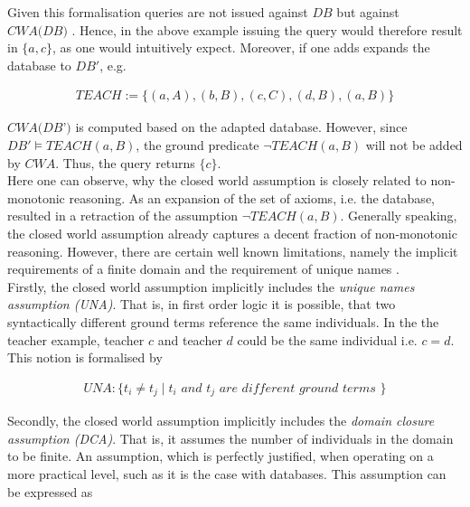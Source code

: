 \documentclass{article}
\begin{document}
Given this formalisation queries are not issued against $DB$ but against $\textit{CWA(DB)}$ \cite{BOCHMAN2007557}. Hence, in the above example issuing the query would therefore result in $\{a,c\}$, as one would intuitively expect. Moreover, if one adds expands the database to $DB'$, e.g. 

\begin{equation*}
\begin{split}
TEACH := \{(a,A), (b,B), (c,C), (d,B), (a,B)\}
\end{split}
\end{equation*}

$\textit{CWA(DB')}$ is computed based on the adapted database. However, since $DB' \models TEACH(a,B)$, the ground predicate $\neg TEACH(a,B)$ will not be added by $\textit{CWA}$. Thus, the query returns $\{c\}$. \\
Here one can observe, why the closed world assumption is closely related to non-monotonic reasoning. As an expansion of the set of axioms, i.e. the database, resulted in a retraction of the assumption $\neg TEACH(a,B)$. Generally speaking, the closed world assumption already captures a decent fraction of non-monotonic reasoning. However, there are certain well known limitations, namely the implicit requirements of a finite domain and the requirement of unique names \cite{BOCHMAN2007557, brewka1997nonmonotonic}.\\

Firstly, the closed world assumption implicitly includes the \emph{unique names assumption (UNA)}. That is, in first order logic it is possible, that two syntactically different ground terms reference the same individuals. In the the teacher example, teacher $c$ and teacher $d$ could be the same individual i.e. $c=d$. This notion is formalised by

\begin{equation*}
\begin{split}
UNA : \{t_i \neq t_j \mid t_i \textit{ and } t_j \textit{ are different ground terms } \}
\end{split}
\end{equation*}

Secondly, the closed world assumption implicitly includes the \emph{domain closure assumption (DCA)}. That is, it assumes the number of individuals in the domain to be finite. An assumption, which is perfectly justified, when operating on a more practical level, such as it is the case with databases. This assumption can be expressed as
\end{document}
